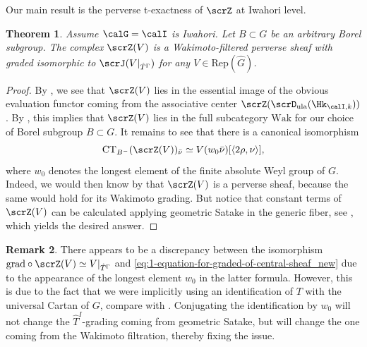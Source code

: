 \documentclass[10pt, reqno]{amsart}
\theoremstyle{plain}
\newtheorem{theorem}{Theorem}[section]
\theoremstyle{definition}
\newtheorem{remark}[theorem]{Remark}
\numberwithin{equation}{section}
\begin{document}
	
	Our main result is the perverse t-exactness of $\scrZ$ at Iwahori level.
	
	\begin{theorem}\label{thm_perversity_new}
		Assume $\calG=\calI$ is Iwahori. Let $B \subset G$ be an arbitrary Borel subgroup. The complex $\scrZ(V)$ is a Wakimoto-filtered perverse sheaf with graded isomorphic to $\scrJ(V|_{\hat{T}^\Gamma})$ for any $V\in \mathrm{Rep}(\hat{G})$.    
	\end{theorem}
	\begin{proof}
		By , we see that $\scrZ(V)$ lies in the essential image of the obvious evaluation functor coming from the associative center $\scrZ(\scrD_{\mathrm{ula}}(\Hk_{\calI, k})) $. By , this implies that $\scrZ(V)$ lies in the full subcategory $\mathrm{Wak}$ for our choice of Borel subgroup $B \subset G$. It remains to see that there is a canonical isomorphism \begin{equation}
			\label{eq:1-equation-for-graded-of-central-sheaf_new}
			\mathrm{CT}_{B^-}(\scrZ(V))_{\bar \nu}\simeq V(w_0\bar \nu)[\langle 2\rho, \nu \rangle],
		\end{equation}
		where $w_0$ denotes the longest element of the finite absolute Weyl group of $G$. Indeed, we would then know by  that $\scrZ(V)$ is a perverse sheaf, because the same would hold for its Wakimoto grading. But notice that constant terms of $\scrZ(V)$ can be calculated applying geometric Satake in the generic fiber, see \cite[Corollary 6.14, Equation (6.32)]{AGLR22}, which yields the desired answer. %
	\end{proof}
	
	\begin{remark}
		There appears to be a discrepancy between the isomorphism $\mathrm{grad}\circ\scrZ(V) \simeq V|_{\hat{T}^\Gamma}$ and \eqref{eq:1-equation-for-graded-of-central-sheaf_new} due to the appearance of the longest element $w_0$ in the latter formula. However, this is due to the fact that we were implicitly using an identification of $T$ with the universal Cartan of $G$, compare with \cite[Remark 1.3.7]{AR}. Conjugating the identification by $w_0$ will not change the $\hat{T}^I$-grading coming from geometric Satake, but will change the one coming from the Wakimoto filtration, thereby fixing the issue.
	\end{remark}
	
\end{document}
